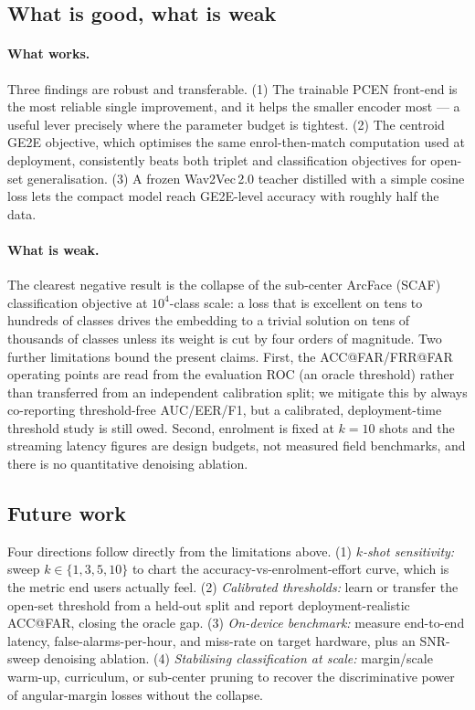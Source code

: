 \documentclass[12pt,a4paper]{article}
\begin{document}
\subsection{What is good, what is weak}\label{sec:goodbad}

\paragraph{What works.} Three findings are robust and transferable. (1) The
trainable PCEN front-end is the most reliable single improvement, and it helps the
smaller encoder most --- a useful lever precisely where the parameter budget is
tightest. (2) The centroid GE2E objective, which optimises the same
enrol-then-match computation used at deployment, consistently beats both triplet
and classification objectives for open-set generalisation. (3) A frozen
Wav2Vec\,2.0 teacher distilled with a simple cosine loss lets the compact model
reach GE2E-level accuracy with roughly half the data.

\paragraph{What is weak.} The clearest negative result is the collapse of the
sub-center ArcFace (SCAF) classification objective at $10^4$-class scale: a loss
that is excellent on tens to hundreds of classes drives the embedding to a trivial
solution on tens of thousands of classes unless its weight is cut by four orders
of magnitude. Two further limitations bound the present claims. First, the
ACC@FAR/FRR@FAR operating points are read from the evaluation ROC (an oracle
threshold) rather than transferred from an independent calibration split; we
mitigate this by always co-reporting threshold-free AUC/EER/F1, but a calibrated,
deployment-time threshold study is still owed. Second, enrolment is fixed at
$k{=}10$ shots and the streaming latency figures are design budgets, not measured
field benchmarks, and there is no quantitative denoising ablation.

\subsection{Future work}\label{sec:future}

Four directions follow directly from the limitations above.
(1) \emph{$k$-shot sensitivity:} sweep $k\in\{1,3,5,10\}$ to chart the
accuracy-vs-enrolment-effort curve, which is the metric end users actually feel.
(2) \emph{Calibrated thresholds:} learn or transfer the open-set threshold from a
held-out split and report deployment-realistic ACC@FAR, closing the oracle gap.
(3) \emph{On-device benchmark:} measure end-to-end latency, false-alarms-per-hour,
and miss-rate on target hardware, plus an SNR-sweep denoising ablation.
(4) \emph{Stabilising classification at scale:} margin/scale warm-up, curriculum,
or sub-center pruning to recover the discriminative power of angular-margin losses
without the collapse.
\end{document}
